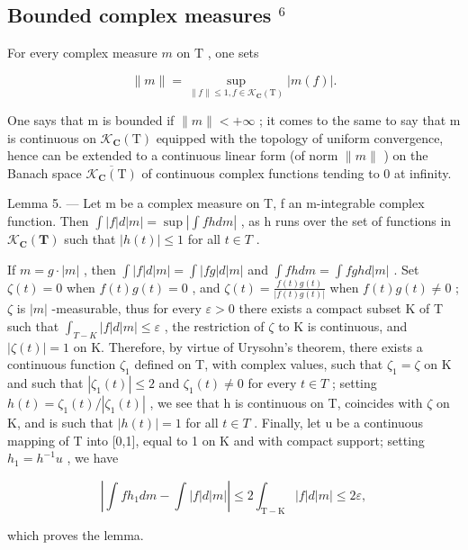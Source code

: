 \subsection{\texorpdfstring{Bounded complex measures \(^{6}\)}{Bounded complex measures (note 6)}}

For every complex measure \(m\) on \(\mathrm{T}\) , one sets

\[
\| m \| = \sup _ {\| f \| \leqslant 1,   f \in \mathcal {K} _ {\mathbf {C}} (\mathrm{T})} | m (f) |.
\]

One says that m is bounded if \(\|m\| < +\infty\) ; it comes to the same to say that m is continuous on \(\mathcal{K}_{\mathbf{C}}(\mathrm{T})\) equipped with the topology of uniform convergence, hence can be extended to a continuous linear form (of norm \(\|m\|\) ) on the Banach space \(\overline{\mathcal{K}_{\mathbf{C}}(\mathrm{T})}\) of continuous complex functions tending to 0 at infinity.

Lemma 5. --- Let m be a complex measure on T, f an m-integrable complex function. Then \(\int |f| d|m| = \sup \left| \int f h dm \right|\) , as h runs over the set of functions in \(\mathcal{K}_{\mathbf{C}}(\mathbf{T})\) such that \(|h(t)| \leqslant 1\) for all \(t \in T\) .

If \(m = g \cdot |m|\) , then \(\int |f| d|m| = \int |fg| d|m|\) and \(\int f h dm = \int f gh d|m|\) . Set \(\zeta(t) = 0\) when \(f(t)g(t) = 0\) , and \(\zeta(t) = \frac{f(t)g(t)}{|f(t)g(t)|}\) when \(f(t)g(t) \neq 0\) ; \(\zeta\) is \(|m|\) -measurable, thus for every \(\varepsilon > 0\) there exists a compact subset K of T such that \(\int_{T-K} |f| d|m| \leqslant \varepsilon\) , the restriction of \(\zeta\) to K is continuous, and \(|\zeta(t)| = 1\) on K. Therefore, by virtue of Urysohn's theorem, there exists a continuous function \(\zeta_1\) defined on T, with complex values, such that \(\zeta_1 = \zeta\) on K and such that \(|\zeta_1(t)| \leqslant 2\) and \(\zeta_1(t) \neq 0\) for every \(t \in T\) ; setting \(h(t) = \zeta_1(t)/|\zeta_1(t)|\) , we see that h is continuous on T, coincides with \(\zeta\) on K, and is such that \(|h(t)| = 1\) for all \(t \in T\) . Finally, let u be a continuous mapping of T into {[}0,1{]}, equal to 1 on K and with compact support; setting \(h_1 = h^{-1}u\) , we have

\[
\left| \int f h _ {1} d m - \int | f | d | m | \right| \leqslant 2 \int_ {\mathrm{T-K}} | f | d | m | \leqslant 2 \varepsilon ,
\]

which proves the lemma.

